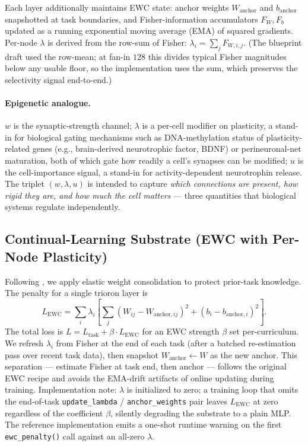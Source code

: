 \documentclass[11pt]{article}
\newcommand{\anchorW}{W_{\text{anchor}}}
\newcommand{\anchorB}{b_{\text{anchor}}}
\newcommand{\Lewc}{L_{\text{EWC}}}
\newcommand{\Ltask}{L_{\text{task}}}
\begin{document}
Each layer additionally maintains EWC state: anchor weights $\anchorW$
and $\anchorB$ snapshotted at task boundaries, and Fisher-information
accumulators $F_W, F_b$ updated as a running exponential moving
average (EMA) of squared gradients.
Per-node $\lambda$ is derived from the row-sum of Fisher:
$\lambda_i = \sum_j F_{W,i,j}$. (The blueprint draft used the row-mean;
at fan-in $128$ this divides typical Fisher magnitudes below any usable
floor, so the implementation uses the sum, which preserves the
selectivity signal end-to-end.)

\paragraph{Epigenetic analogue.}
$w$ is the synaptic-strength channel; $\lambda$ is a per-cell modifier
on plasticity, a stand-in for biological gating mechanisms such as
DNA-methylation status of plasticity-related genes
(e.g., brain-derived neurotrophic factor, BDNF) or
perineuronal-net maturation, both of which gate how readily a cell's
synapses can be modified; $u$ is the cell-importance signal, a stand-in
for activity-dependent neurotrophin release. The triplet
$(w, \lambda, u)$ is intended to capture \emph{which connections are
present, how rigid they are, and how much the cell matters} --- three
quantities that biological systems regulate independently.

\subsection{Continual-Learning Substrate (EWC with Per-Node Plasticity)}
\label{sec:ewc-substrate}

Following \citet{kirkpatrick2017overcoming}, we apply elastic weight
consolidation to protect prior-task knowledge. The penalty for a single
trioron layer is
\begin{equation}
  \Lewc = \sum_i \lambda_i \left[
    \sum_j (W_{ij} - W_{\text{anchor},ij})^{2}
         + (b_i - b_{\text{anchor},i})^{2}
  \right].
\end{equation}
The total loss is $L = \Ltask + \beta \cdot \Lewc$ for an EWC strength
$\beta$ set per-curriculum. We refresh $\lambda_i$ from Fisher at the
end of each task (after a batched re-estimation pass over recent task
data), then snapshot $\anchorW \leftarrow W$ as the new anchor. This
separation --- estimate Fisher at task end, then anchor --- follows the
original EWC recipe and avoids the EMA-drift artifacts of online
updating during training.
Implementation note: $\lambda$ is initialized to zero; a training loop
that omits the end-of-task \texttt{update\_lambda} / \texttt{anchor\_weights}
pair leaves $\Lewc$ at zero regardless of the coefficient $\beta$,
silently degrading the substrate to a plain MLP. The reference
implementation emits a one-shot runtime warning on the first
\texttt{ewc\_penalty()} call against an all-zero $\lambda$.
\end{document}
